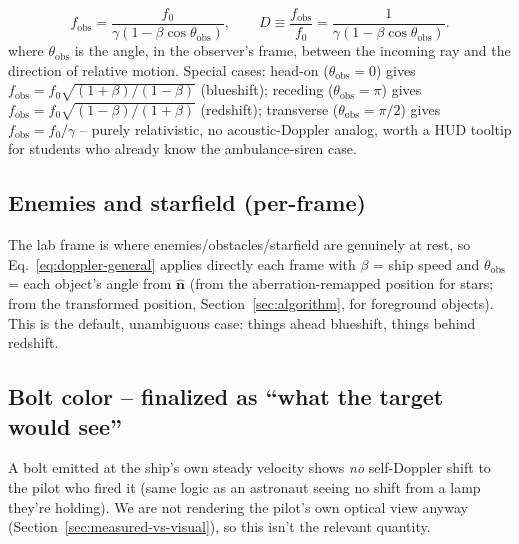 \documentclass[11pt]{article}
\newcommand{\uv}[1]{\hat{\mathbf{#1}}}
\begin{document}
\begin{equation}
  f_{\text{obs}} = \frac{f_0}{\gamma\left(1-\beta\cos\theta_{\text{obs}}\right)}, \qquad D \equiv \frac{f_{\text{obs}}}{f_0} = \frac{1}{\gamma(1-\beta\cos\theta_{\text{obs}})}.
  \label{eq:doppler-general}
\end{equation}
where $\theta_{\text{obs}}$ is the angle, in the observer's frame, between the incoming ray and the direction of relative motion. Special cases: head-on ($\theta_{\text{obs}}=0$) gives $f_{\text{obs}}=f_0\sqrt{(1+\beta)/(1-\beta)}$ (blueshift); receding ($\theta_{\text{obs}}=\pi$) gives $f_{\text{obs}}=f_0\sqrt{(1-\beta)/(1+\beta)}$ (redshift); transverse ($\theta_{\text{obs}}=\pi/2$) gives $f_{\text{obs}}=f_0/\gamma$ -- purely relativistic, no acoustic-Doppler analog, worth a HUD tooltip for students who already know the ambulance-siren case.

\subsection{Enemies and starfield (per-frame)}
The lab frame is where enemies/obstacles/starfield are genuinely at rest, so Eq.~\eqref{eq:doppler-general} applies directly each frame with $\beta$ = ship speed and $\theta_{\text{obs}}$ = each object's angle from $\uv n$ (from the aberration-remapped position for stars; from the transformed position, Section~\ref{sec:algorithm}, for foreground objects). This is the default, unambiguous case: things ahead blueshift, things behind redshift.

\subsection{Bolt color -- finalized as ``what the target would see''}
\label{sec:bolt-doppler}
A bolt emitted at the ship's own steady velocity shows \emph{no} self-Doppler shift to the pilot who fired it (same logic as an astronaut seeing no shift from a lamp they're holding). We are not rendering the pilot's own optical view anyway (Section~\ref{sec:measured-vs-visual}), so this isn't the relevant quantity.
\end{document}
